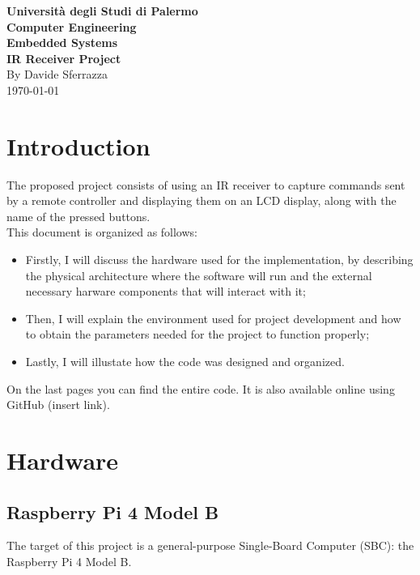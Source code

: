 \documentclass[a4paper, 12pt]{article}
\begin{document}
\begin{titlepage}
    \begin{center}
        \vspace*{1cm}
        \Large\textbf{Università degli Studi di Palermo } \\
        \Large\textbf{Computer Engineering} \\
        \vfill
        \Huge\textbf{Embedded Systems} \\[3mm]
        \Large\textbf{IR Receiver Project} \\[1mm]
        \vfill
        By Davide Sferrazza\\
        \today
    \end{center}
\end{titlepage}

\tableofcontents
\thispagestyle{empty}
\clearpage

\setcounter{page}{1}

\section{Introduction}
The proposed project consists of using an IR receiver to capture commands sent by a remote controller and displaying them on an LCD display, along with the name of the pressed buttons. \\
This document is organized as follows:
\begin{itemize}
    \item Firstly, I will discuss the hardware used for the implementation, by describing the physical architecture where the software will run and the external necessary harware components that will interact with it;
    \item  Then, I will explain the environment used for project development and how to obtain the parameters needed for the project to function properly;
    \item Lastly, I will illustate how the code was designed and organized.
\end{itemize}

On the last pages you can find the entire code. It is also available online using GitHub (insert link). 

\section{Hardware}
\subsection{Raspberry Pi 4 Model B}
The target of this project is a general-purpose Single-Board Computer (SBC): the Raspberry Pi 4 Model B. 
\end{document}
